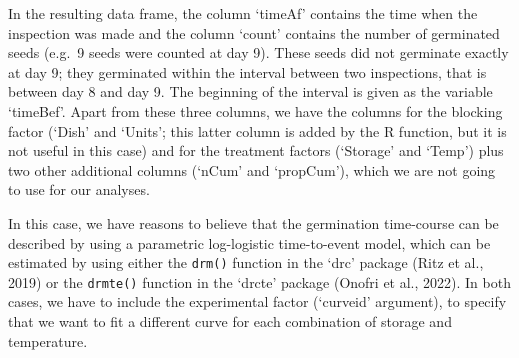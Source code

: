 \documentclass[
]{book}
\begin{document}
In the resulting data frame, the column `timeAf' contains the time when the inspection was made and the column `count' contains the number of germinated seeds (e.g.~9 seeds were counted at day 9). These seeds did not germinate exactly at day 9; they germinated within the interval between two inspections, that is between day 8 and day 9. The beginning of the interval is given as the variable `timeBef'. Apart from these three columns, we have the columns for the blocking factor (`Dish' and `Units'; this latter column is added by the R function, but it is not useful in this case) and for the treatment factors (`Storage' and `Temp') plus two other additional columns (`nCum' and `propCum'), which we are not going to use for our analyses.

In this case, we have reasons to believe that the germination time-course can be described by using a parametric log-logistic time-to-event model, which can be estimated by using either the \texttt{drm()} function in the `drc' package (Ritz et al., 2019) or the \texttt{drmte()} function in the `drcte' package (Onofri et al., 2022). In both cases, we have to include the experimental factor (`curveid' argument), to specify that we want to fit a different curve for each combination of storage and temperature.
\end{document}

